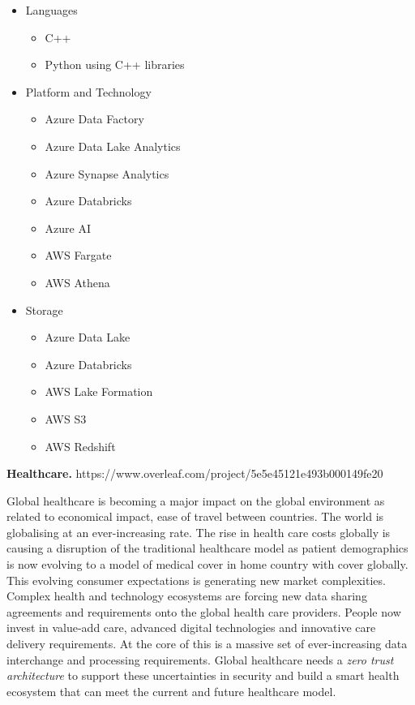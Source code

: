 \begin{Workpackage}{\thewpno}
\begin{Task}
\begin{itemize}
    \item Languages
        \begin{itemize}
            \item C++
            \item Python using C++ libraries
        \end{itemize}
    \item Platform and Technology
        \begin{itemize}
            \item Azure Data Factory
            \item Azure Data Lake Analytics
            \item Azure Synapse Analytics
            \item Azure Databricks
            \item Azure AI
            \item AWS Fargate
            \item AWS Athena
        \end{itemize}
    \item Storage
        \begin{itemize}
            \item Azure Data Lake
            \item Azure Databricks
            \item AWS Lake Formation
            \item AWS S3
            \item AWS Redshift
        \end{itemize}
\end{itemize}

\textbf{Healthcare.} https://www.overleaf.com/project/5e5e45121e493b000149fe20

Global healthcare is becoming a major impact on the global environment as related to economical impact, ease of travel between countries. The world is globalising at an ever-increasing rate. The rise in health care costs globally is causing a disruption of the traditional healthcare model as patient demographics is now evolving to a model of medical cover in home country with cover globally. This evolving consumer expectations is generating new market complexities. Complex health and technology ecosystems are forcing new data sharing agreements and requirements onto the global health care providers. People now invest in value-add care, advanced digital technologies and innovative care delivery requirements. At the core of this is a massive set of ever-increasing data interchange and processing requirements. Global healthcare needs a \emph{zero trust architecture} to support these uncertainties in security and build a smart health ecosystem that can meet the current and future healthcare model.


\end{Task}
\end{Workpackage}
